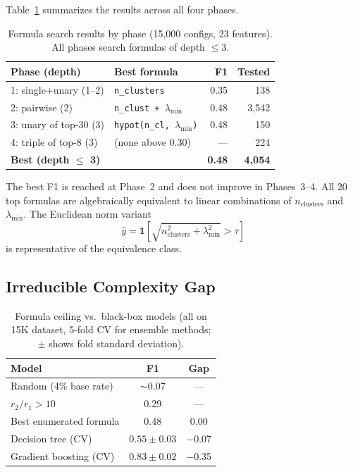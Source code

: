 \documentclass[journal]{IEEEtran}
\begin{document}
Table~\ref{tab:phases} summarizes the results across all four phases.

\begin{table}[h]
\caption{Formula search results by phase (15{,}000 configs, 23 features).
All phases search formulas of depth $\leq 3$.}
\label{tab:phases}
\scriptsize
\begin{tabular}{@{}llrr@{}}
\toprule
Phase (depth) & Best formula & F1 & Tested \\
\midrule
1: single+unary (1--2) & \texttt{n\_clusters} & 0.35 & 138 \\
2: pairwise (2) & \texttt{n\_clust + $\lambda_\mathrm{min}$} & 0.48 & 3{,}542 \\
3: unary of top-30 (3) & \texttt{hypot(n\_cl, $\lambda_\mathrm{min}$)} & 0.48 & 150 \\
4: triple of top-8 (3) & (none above 0.30) & --- & 224 \\
\midrule
\textbf{Best (depth $\leq$ 3)} & & \textbf{0.48} & \textbf{4{,}054} \\
\bottomrule
\end{tabular}
\end{table}

The best F1 is reached at Phase~2 and does not improve in Phases~3--4.
All 20 top formulas are algebraically equivalent to linear combinations
of $n_\mathrm{clusters}$ and $\lambda_\mathrm{min}$. The Euclidean
norm variant
\begin{equation}
\hat{y} = \mathbf{1}\!\left[
\sqrt{n_\mathrm{clusters}^2 + \lambda_\mathrm{min}^2} > \tau
\right]
\end{equation}
is representative of the equivalence class.

\subsection{Irreducible Complexity Gap}

\begin{table}[h]
\caption{Formula ceiling vs.\ black-box models (all on 15K dataset,
5-fold CV for ensemble methods; $\pm$ shows fold standard deviation).}
\label{tab:gap}
\begin{tabular}{lcc}
\toprule
Model & F1 & Gap \\
\midrule
Random (4\% base rate) & $\sim$0.07 & --- \\
$r_2/r_1 > 10$ & 0.29 & --- \\
Best enumerated formula & 0.48 & 0.00 \\
Decision tree (CV) & $0.55 \pm 0.03$ & $-$0.07 \\
Gradient boosting (CV) & $0.83 \pm 0.02$ & $-$0.35 \\
\bottomrule
\end{tabular}
\end{table}
\end{document}

